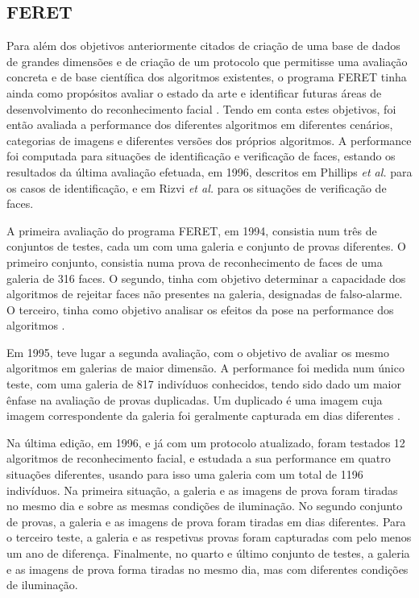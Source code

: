 \subsection{FERET}
Para além dos objetivos anteriormente citados de criação de uma base de dados de grandes dimensões e de criação de um protocolo que permitisse uma avaliação concreta e de base científica dos algoritmos existentes, o programa FERET tinha ainda como propósitos avaliar o estado da arte e identificar futuras áreas de desenvolvimento do reconhecimento facial \cite{Phillips2000}. Tendo em conta estes objetivos, foi então avaliada a performance dos diferentes algoritmos em diferentes cenários, categorias de imagens e diferentes versões dos próprios algoritmos. A performance foi computada para situações de identificação e verificação de faces, estando os resultados da última avaliação efetuada, em 1996, descritos em Phillips \textit{et al.} \cite{Phillips2000} para os casos de identificação, e em Rizvi \textit{et al.} \cite{Rizvi2000} para os situações de verificação de faces.

A primeira avaliação do programa FERET, em 1994, consistia num três de conjuntos de testes, cada um com uma galeria e conjunto de provas diferentes. O primeiro conjunto, consistia numa prova de reconhecimento de faces de uma galeria de 316 faces. O segundo, tinha com objetivo determinar a capacidade dos algoritmos de rejeitar faces não presentes na galeria, designadas de falso-alarme. O terceiro, tinha como objetivo analisar os efeitos da pose na performance dos algoritmos \citep{Phillips2000}.

Em 1995, teve lugar a segunda avaliação, com o objetivo de  avaliar os mesmo algoritmos em galerias de maior dimensão. A performance foi medida num único teste, com uma galeria de 817 indivíduos conhecidos, tendo sido dado um maior ênfase na avaliação de provas duplicadas. Um duplicado é uma imagem cuja imagem correspondente da galeria foi geralmente capturada em dias diferentes  \citep{Phillips2000}.

Na última edição, em 1996, e já com um protocolo atualizado, foram testados 12 algoritmos de reconhecimento facial, e estudada a sua performance em quatro situações diferentes, usando para isso uma galeria com um total de 1196 indivíduos. Na primeira situação, a galeria e as imagens de prova foram tiradas no mesmo dia e sobre as mesmas condições de iluminação. No segundo conjunto de provas, a galeria e as imagens de prova foram tiradas em dias diferentes. Para o terceiro teste, a galeria e as respetivas provas foram capturadas com pelo menos um ano de diferença. Finalmente, no quarto e último conjunto de testes, a galeria e as imagens de prova forma tiradas no mesmo dia, mas com diferentes condições de iluminação.

